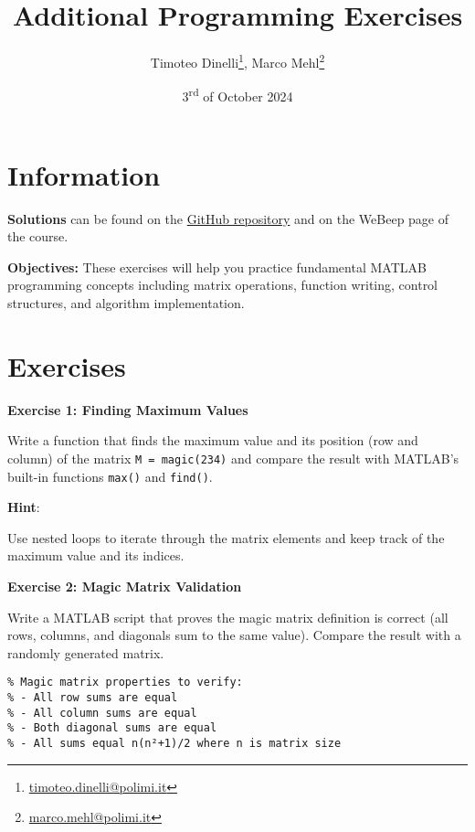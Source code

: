 \documentclass[oneside]{article}
\title{Additional Programming Exercises}
\author{Timoteo Dinelli\footnote{\href{mailto:timoteo.dinelli@polimi.it}{timoteo.dinelli@polimi.it}}, Marco Mehl\footnote{\href{mailto:marco.mehl@polimi.it}{marco.mehl@polimi.it}}}
\date{3\textsuperscript{rd} of October 2024}
\begin{document}
\maketitle

\section*{Information}
\textcolor{NavyBlue}{\textbf{Solutions}} can be found on the
\href{https://github.com/Titodinelli/Calcoli-di-Processo-dell-Ingegneria-Chimica}{GitHub
repository} and on the WeBeep page of the course.

\noindent \textcolor{NavyBlue}{\textbf{Objectives:}} These exercises will help you practice
fundamental MATLAB programming concepts including matrix operations, function writing,
control structures, and algorithm implementation.

\section*{Exercises}

\textbf{Exercise 1: Finding Maximum Values}

\noindent Write a function that finds the maximum value and its position (row and column) of the
matrix \texttt{M = magic(234)} and compare the result with MATLAB's built-in functions
\texttt{max()} and \texttt{find()}.

\noindent \textbf{Hint}:

\noindent Use nested loops to iterate through the matrix elements and keep track of the maximum value and its indices.

\vspace{0.5cm}

\textbf{Exercise 2: Magic Matrix Validation}

Write a MATLAB script that proves the magic matrix definition is correct (all rows,
columns, and diagonals sum to the same value). Compare the result with a randomly
generated matrix.

\begin{verbatim}
% Magic matrix properties to verify:
% - All row sums are equal
% - All column sums are equal  
% - Both diagonal sums are equal
% - All sums equal n(n²+1)/2 where n is matrix size
\end{verbatim}
\end{document}
